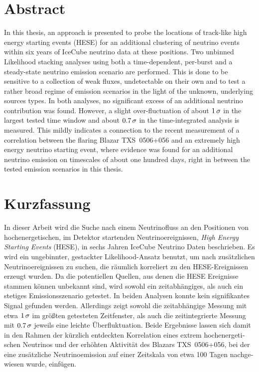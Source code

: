 \thispagestyle{plain}

\section*{Abstract}
In this thesis, an approach is presented to probe the locations of track-like high energy starting events (HESE) for an additional clustering of neutrino events within six years of IceCube neutrino data at these positions.
Two unbinned Likelihood stacking analyses using both a time-dependent, per-burst and a steady-state neutrino emission scenario are performed.
This is done to be sensitive to a collection of weak fluxes, undetectable on their own and to test a rather broad regime of emission scenarios in the light of the unknown, underlying sources types.
In both analyses, no significant excess of an additional neutrino contribution was found.
However, a slight over-fluctuation of about $\num{1}\,\sigma$ in the largest tested time window and about $\num{0.7}\,\sigma$ in the time-integrated analysis is measured.
This mildly indicates a connection to the recent measurement of a correlation between the flaring Blazar TXS~0506+056 and an extremely high energy neutrino starting event, where evidence was found for an additional neutrino emission on timescales of about one hundred days, right in between the tested emission scenarios in this thesis.

\section*{Kurzfassung}
\begin{german}
In dieser Arbeit wird die Suche nach einem Neutrinofluss an den Positionen von hochenergetischen, im Detektor startenden Neutrinoereignissen, \emph{High Energy Starting Events} (HESE), in sechs Jahren IceCube Neutrino Daten beschrieben.
Es wird ein ungebinnter, gestackter Likelihood-Ansatz benutzt, um nach zusätzlichen Neutrinoereignissen zu suchen, die räumlich korreliert zu den HESE-Ereignissen erzeugt wurden.
Da die potentiellen Quellen, aus denen die HESE Ereignisse stammen können unbekannt sind, wird sowohl ein zeitabhängiges, als auch ein stetiges Emissionsszenario getestet.
In beiden Analysen konnte kein signifikantes Signal gefunden werden.
Allerdings zeigt sowohl die zeitabhängige Messung mit etwa $\num{1}\,\sigma$ im größten getesteten Zeitfenster, als auch die zeitintegrierte Messung mit $\num{0.7}\,\sigma$ jeweils eine leichte Überfluktuation.
Beide Ergebnisse lassen sich damit in den Rahmen der kürzlich entdeckten Korrelation eines extrem hochenergetischen Neutrinos und der erhöhten Aktivität des Blazars TXS~0506+056, bei der eine zusätzliche Neutrinoemission auf einer Zeitskala von etwa 100 Tagen nachgewiesen wurde, einfügen.
\end{german}
